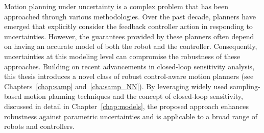 Motion planning under uncertainty is a complex problem that has been approached through various methodologies. 
Over the past decade, planners have emerged that explicitly consider the feedback controller action in responding to uncertainties. 
However, the guarantees provided by these planners often depend on having an accurate model of both the robot and the controller. 
Consequently, uncertainties at this modeling level can compromise the robustness of these approaches. 
Building on recent advancements in closed-loop sensitivity analysis, this thesis introduces a novel class of robust control-aware motion planners (see Chapters~\ref{chap:samp} and~\ref{cha:samp_NN}). 
By leveraging widely used sampling-based motion planning techniques and the concept of closed-loop sensitivity, discussed in detail in Chapter~\ref{chap:models}, the proposed approach enhances robustness against parametric uncertainties and is applicable to a broad range of robots and controllers. 